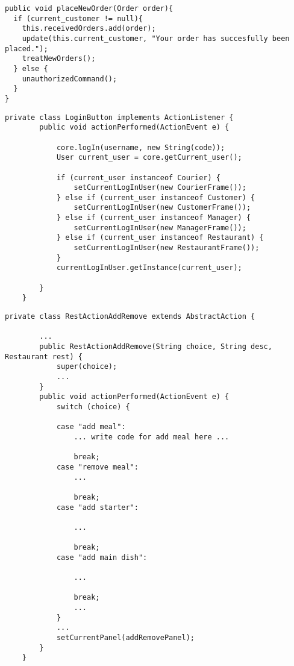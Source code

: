 \begin{lstlisting}[caption=Method to place an \texttt{Order} of \texttt{Core}.,
label=lst:placeOrder]
public void placeNewOrder(Order order){
  if (current_customer != null){
  	this.receivedOrders.add(order);
  	update(this.current_customer, "Your order has succesfully been placed.");
  	treatNewOrders();
  } else {
  	unauthorizedCommand();
  }
}
\end{lstlisting}

\begin{lstlisting}[caption=Strategy pattern to log in user.,
   label=lst:login_user_GUI] 
private class LoginButton implements ActionListener {
		public void actionPerformed(ActionEvent e) {

			core.logIn(username, new String(code));
			User current_user = core.getCurrent_user();

			if (current_user instanceof Courier) {
				setCurrentLogInUser(new CourierFrame());
			} else if (current_user instanceof Customer) {
				setCurrentLogInUser(new CustomerFrame());
			} else if (current_user instanceof Manager) {
				setCurrentLogInUser(new ManagerFrame());
			} else if (current_user instanceof Restaurant) {
				setCurrentLogInUser(new RestaurantFrame());
			}
			currentLogInUser.getInstance(current_user);
			
		}
	}
\end{lstlisting}

\begin{lstlisting}[caption=Nested action classes in restaurant.,
   label=lst:nested_class_rest] 
private class RestActionAddRemove extends AbstractAction {

		...
		public RestActionAddRemove(String choice, String desc, Restaurant rest) {
			super(choice);
			...
		}
		public void actionPerformed(ActionEvent e) {
			switch (choice) {

			case "add meal":
				... write code for add meal here ...
				
				break;
			case "remove meal":
				... 

				break;
			case "add starter":

				...

				break;
			case "add main dish":

				...

				break;
				...
			}
			...
			setCurrentPanel(addRemovePanel);
		}
	}
\end{lstlisting}

\lstset{basicstyle=\rm\small\ttfamily}
